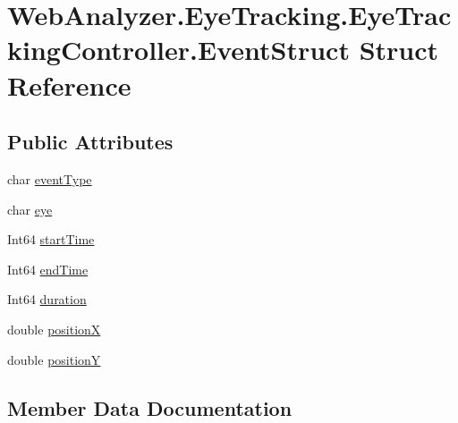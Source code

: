 \hypertarget{struct_web_analyzer_1_1_eye_tracking_1_1_eye_tracking_controller_1_1_event_struct}{}\section{Web\+Analyzer.\+Eye\+Tracking.\+Eye\+Tracking\+Controller.\+Event\+Struct Struct Reference}
\label{struct_web_analyzer_1_1_eye_tracking_1_1_eye_tracking_controller_1_1_event_struct}
\subsection*{Public Attributes}
\begin{DoxyCompactItemize}
\item 
char \hyperlink{struct_web_analyzer_1_1_eye_tracking_1_1_eye_tracking_controller_1_1_event_struct_ad58facc61402df1a22a935a5ae52c22b}{event\+Type}
\item 
char \hyperlink{struct_web_analyzer_1_1_eye_tracking_1_1_eye_tracking_controller_1_1_event_struct_a9974811eb98d7f853b8d8c7a7234b69b}{eye}
\item 
Int64 \hyperlink{struct_web_analyzer_1_1_eye_tracking_1_1_eye_tracking_controller_1_1_event_struct_ae43681b70dc05d38f8f6531dca8db700}{start\+Time}
\item 
Int64 \hyperlink{struct_web_analyzer_1_1_eye_tracking_1_1_eye_tracking_controller_1_1_event_struct_a2c290bbd4b8b528a4ced227a59c27d8a}{end\+Time}
\item 
Int64 \hyperlink{struct_web_analyzer_1_1_eye_tracking_1_1_eye_tracking_controller_1_1_event_struct_a5b6b738be762cbf9b5a5e7eaa585bf7b}{duration}
\item 
double \hyperlink{struct_web_analyzer_1_1_eye_tracking_1_1_eye_tracking_controller_1_1_event_struct_a50f2905fbda302690d41aaa6abac777c}{position\+X}
\item 
double \hyperlink{struct_web_analyzer_1_1_eye_tracking_1_1_eye_tracking_controller_1_1_event_struct_aa171f5ea80d9d5a289ef515a1004ae0a}{position\+Y}
\end{DoxyCompactItemize}


\subsection{Member Data Documentation}
\hypertarget{struct_web_analyzer_1_1_eye_tracking_1_1_eye_tracking_controller_1_1_event_struct_a5b6b738be762cbf9b5a5e7eaa585bf7b}{}
